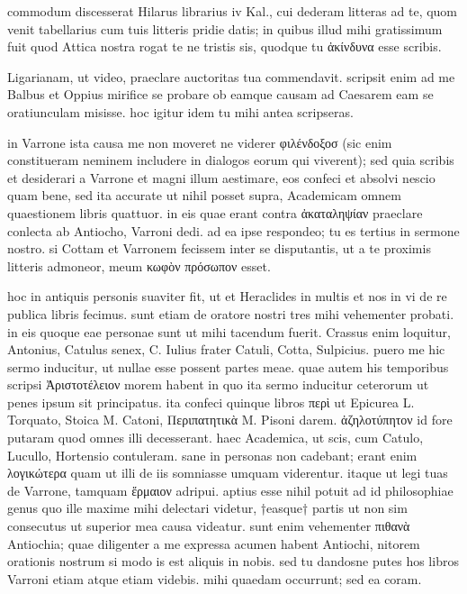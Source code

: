 


 commodum discesserat Hilarus librarius iv Kal., cui dederam litteras ad te, quom venit tabellarius cum tuis litteris pridie datis; in quibus illud mihi gratissimum fuit quod Attica nostra rogat te ne tristis sis, quodque tu ἀκίνδυνα esse scribis.

 Ligarianam, ut video, praeclare auctoritas tua commendavit. scripsit enim ad me Balbus et Oppius mirifice se probare ob eamque causam ad Caesarem eam se oratiunculam misisse. hoc igitur idem tu mihi antea scripseras.

 in Varrone ista causa me non moveret ne viderer φιλένδοξοσ (sic enim constitueram neminem includere in dialogos eorum qui viverent); sed quia scribis et desiderari a Varrone et magni illum aestimare, eos confeci et absolvi nescio quam bene, sed ita accurate ut nihil posset supra, Academicam omnem quaestionem libris quattuor. in eis quae erant contra ἀκαταληψίαν praeclare conlecta ab Antiocho, Varroni dedi. ad ea ipse respondeo; tu es tertius in sermone nostro. si Cottam et Varronem fecissem inter se disputantis, ut a te proximis litteris admoneor, meum κωφὸν πρόσωπον esset.

 hoc in antiquis personis suaviter fit, ut et Heraclides in multis et nos in vi de re publica libris fecimus. sunt etiam de oratore nostri tres mihi vehementer probati. in eis quoque eae personae sunt ut mihi tacendum fuerit. Crassus enim loquitur, Antonius, Catulus senex, C. Iulius frater Catuli, Cotta, Sulpicius. puero me hic sermo inducitur, ut nullae esse possent partes meae. quae autem his temporibus scripsi Ἀριστοτέλειον morem habent in quo ita sermo inducitur ceterorum ut penes ipsum sit principatus. ita confeci quinque libros περὶ ut Epicurea L. Torquato, Stoica M. Catoni, Περιπατητικὰ M. Pisoni darem. ἀζηλοτύπητον id fore putaram quod omnes illi decesserant. haec Academica, ut scis, cum Catulo, Lucullo, Hortensio contuleram. sane in personas non cadebant; erant enim λογικώτερα quam ut illi de iis somniasse umquam viderentur. itaque ut legi tuas de Varrone, tamquam ἕρμαιον adripui. aptius esse nihil potuit ad id philosophiae genus quo ille maxime mihi delectari videtur, †easque† partis ut non sim consecutus ut superior mea causa videatur. sunt enim vehementer πιθανὰ Antiochia; quae diligenter a me expressa acumen habent Antiochi, nitorem orationis nostrum si modo is est aliquis in nobis. sed tu dandosne putes hos libros Varroni etiam atque etiam videbis. mihi quaedam occurrunt; sed ea coram.
